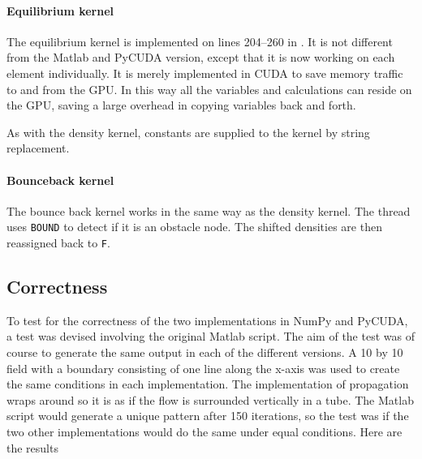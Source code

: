 \paragraph{Equilibrium kernel}
The equilibrium kernel is implemented on lines 204--260 in . It is not different from the Matlab and PyCUDA version, except that it is now working on each element individually. It is merely implemented in CUDA to save memory traffic to and from the GPU. In this way all the variables and calculations can reside on the GPU, saving a large overhead in copying variables back and forth.

As with the density kernel, constants are supplied to the kernel by string replacement.


\paragraph{Bounceback kernel}
The bounce back kernel works in the same way as the density kernel. The thread uses \texttt{BOUND} to detect if it is an obstacle node. The shifted densities are then reassigned back to \texttt{F}.




\subsection{Correctness}
To test for the correctness of the two implementations in NumPy and PyCUDA, a test was devised involving the original Matlab script. The aim of the test was of course to generate the same output in each of the different versions. A 10 by 10 field with a boundary consisting of one line along the x-axis was used to create the same conditions in each implementation. The implementation of propagation wraps around so it is as if the flow is surrounded vertically in a tube. The Matlab script would generate a unique pattern after 150 iterations, so the test was if the two other implementations would do the same under equal conditions. Here are the results


